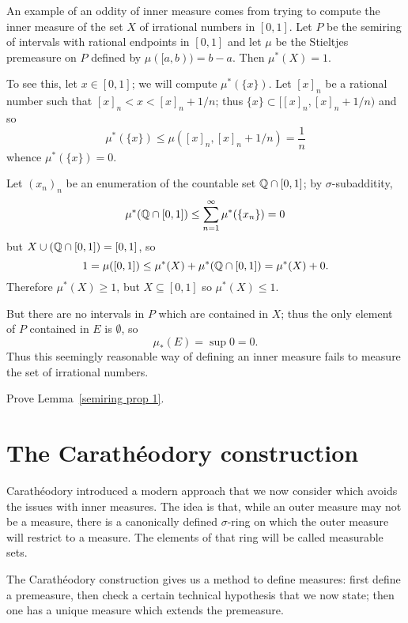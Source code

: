 \begin{example}
An example of an oddity of inner measure comes from trying to compute the inner measure of the set $X$ of irrational numbers in $[0, 1]$.
Let $P$ be the semiring of intervals with rational endpoints in $[0, 1]$ and let $\mu$ be the Stieltjes premeasure on $P$ defined by $\mu([a, b)) = b - a$.
Then $\mu^*(X) = 1$.

To see this, let $x \in [0, 1]$; we will compute $\mu^*(\{x\})$. Let $[x]_{n}$ be a rational number such that $[x]_{n} < x < [x]_{n} + 1/n$; thus $\{x\} \subset [[x]_{n}, [x]_{n} + 1/n)$ and so
\[\mu^*(\{x\}) \leq \mu([x]_{n}, [x]_{n} + 1/n) = \frac{1}{n}\]
whence $\mu^*(\{x\}) = 0$.

Let $(x_{n})_{n}$ be an enumeration of the countable set $\mathbb{Q} \cap [0, 1]$; by $\sigma$-subadditity,
\[\mu^*(\mathbb{Q} \cap [0, 1]) \leq \sum_{n=1}^{\infty} \mu^*(\{x_{n}\}) = 0\]
but $X \cup (\mathbb{Q} \cap [0, 1]) = [0, 1]$, so
\[1 = \mu([0, 1]) \leq \mu^*(X) + \mu^*(\mathbb{Q} \cap [0, 1]) = \mu^*(X) + 0.\]
Therefore $\mu^*(X) \geq 1$, but $X \subseteq [0, 1]$ so $\mu^*(X) \leq 1$.

But there are no intervals in $P$ which are contained in $X$; thus the only element of $P$ contained in $E$ is $\emptyset$, so
\[\mu_*(E) = \sup 0 = 0.\]
Thus this seemingly reasonable way of defining an inner measure fails to measure the set of irrational numbers.
\end{example}

\begin{exercise}
\label{semiring exercise}
Prove Lemma~\ref{semiring prop 1}.
\end{exercise}


\section{The Carathéodory construction}
Carathéodory introduced a modern approach that we now consider which avoids the issues with inner measures.
The idea is that, while an outer measure may not be a measure, there is a canonically defined $\sigma$-ring on which the outer measure will restrict to a measure.
The elements of that ring will be called measurable sets.

\begin{subsec}
The Carathéodory construction gives us a method to define measures: first define a premeasure, then check a certain technical hypothesis that we now state; then one has a unique measure which extends the premeasure.
\end{subsec}

